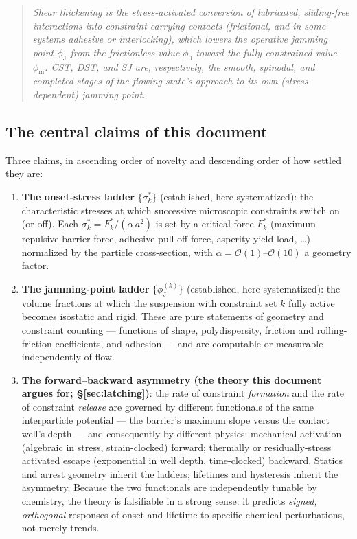\documentclass[11pt]{article}
\newcommand{\phiJ}{\phi_{\mathrm{J}}}
\newcommand{\phiO}{\phi_{0}}
\newcommand{\phiM}{\phi_{\mathrm{m}}}
\newcommand{\sigmastar}{\sigma^{*}}
\newcommand{\Fstar}{F^{*}}
\begin{document}
\begin{quote}
\emph{Shear thickening is the stress-activated conversion of lubricated, sliding-free interactions into constraint-carrying contacts (frictional, and in some systems adhesive or interlocking), which lowers the operative jamming point $\phiJ$ from the frictionless value $\phiO$ toward the fully-constrained value $\phiM$. CST, DST, and SJ are, respectively, the smooth, spinodal, and completed stages of the flowing state's approach to its own (stress-dependent) jamming point.}
\end{quote}

\subsection{The central claims of this document}
\label{sec:claims}
Three claims, in ascending order of novelty and descending order of how settled they are:

\begin{enumerate}
\item \textbf{The onset-stress ladder} $\{\sigmastar_k\}$ (established, here systematized): the characteristic stresses at which successive microscopic constraints switch on (or off). Each $\sigmastar_k = \Fstar_k / (\alpha\, a^2)$ is set by a critical force $\Fstar_k$ (maximum repulsive-barrier force, adhesive pull-off force, asperity yield load, \ldots) normalized by the particle cross-section, with $\alpha = \mathcal{O}(1)$--$\mathcal{O}(10)$ a geometry factor.
\item \textbf{The jamming-point ladder} $\{\phiJ^{(k)}\}$ (established, here systematized): the volume fractions at which the suspension with constraint set $k$ fully active becomes isostatic and rigid. These are pure statements of geometry and constraint counting --- functions of shape, polydispersity, friction and rolling-friction coefficients, and adhesion --- and are computable or measurable independently of flow.
\item \textbf{The forward--backward asymmetry (the theory this document argues for; \S\ref{sec:latching})}: the rate of constraint \emph{formation} and the rate of constraint \emph{release} are governed by different functionals of the same interparticle potential --- the barrier's maximum slope versus the contact well's depth --- and consequently by different physics: mechanical activation (algebraic in stress, strain-clocked) forward; thermally or residually-stress activated escape (exponential in well depth, time-clocked) backward. Statics and arrest geometry inherit the ladders; lifetimes and hysteresis inherit the asymmetry. Because the two functionals are independently tunable by chemistry, the theory is falsifiable in a strong sense: it predicts \emph{signed, orthogonal} responses of onset and lifetime to specific chemical perturbations, not merely trends.
\end{enumerate}
\end{document}
